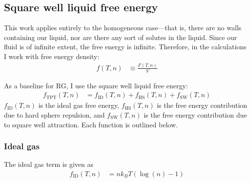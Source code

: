 \documentclass[letterpaper,twocolumn,amsmath,amssymb,prb]{revtex4-1}
\newcommand{\kT}{\ensuremath{k_BT}}
\newcommand{\fid}{\ensuremath{f_\text{ID}(T,n)}}
\newcommand{\fhs}{\ensuremath{f_\text{HS}(T,n)}}
\newcommand{\fsw}{\ensuremath{f_\text{SW}(T,n)}}
\begin{document}
\subsection{Square well liquid free energy}\label{subsec:SW}

This work applies entirely to the homogeneous case---that is, there
are no walls containing our liquid, nor are there any sort of solutes
in the liquid. Since our fluid is of infinite extent, the free energy
is infinite. Therefore, in the calculations I work with free energy density:
\begin{align}
  f(T,n) &\equiv \frac{F(T,n)}{V}
\end{align}

As a baseline for RG, I use the square well liquid free energy:\cite{Hughes13}
\begin{align}
  f_\text{TPT}(T,n) &= \fid + \fhs + \fsw
\end{align}
$\fid$ is the ideal gas free energy, $\fhs$ is the free energy contribution due to hard sphere
repulsion, and $\fsw$ is the free energy contribution due to square well attraction. Each function is outlined below.

\subsubsection{Ideal gas}\label{sub2sec:ID}
The ideal gas term is given as
\begin{align}
  \fid &= n\kT\left(\log(n) - 1\right)
\end{align}
\end{document}
